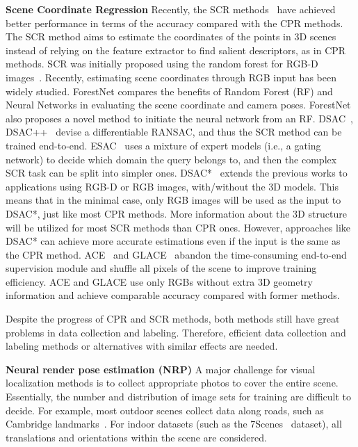 \textbf{Scene Coordinate Regression} Recently, the SCR methods~\cite{shotton2013scene,brachmann2017dsac,brachmann2018learning,esac,massiceti2017random,li2018scene,brachmann2021visual,liu2025egfs} have achieved better performance in terms of the accuracy compared with the CPR methods. The SCR method aims to estimate the coordinates of the points in 3D scenes instead of relying on the feature extractor to find salient descriptors, as in CPR methods. SCR was initially proposed using the random forest for RGB-D images~\cite{shotton2013scene}. Recently, estimating scene coordinates through RGB input has been widely studied. ForestNet\cite{massiceti2017random} compares the benefits of Random Forest (RF) and Neural Networks in evaluating the scene coordinate and camera poses. ForestNet also proposes a novel method to initiate the neural network from an RF. DSAC~\cite{brachmann2017dsac}, DSAC++~\cite{brachmann2018learning} devise a differentiable RANSAC, and thus the SCR method can be trained end-to-end. ESAC~\cite{esac} uses a mixture of expert models (i.e., a gating network) to decide which domain the query belongs to, and then the complex SCR task can be split into simpler ones. DSAC*~\cite{brachmann2021visual} extends the previous works to applications using RGB-D or RGB images, with/without the 3D models. 
This means that in the minimal case, only RGB images will be used as the input to DSAC*, just like most CPR methods. 
More information about the 3D structure will be utilized for most SCR methods than CPR ones. However, approaches like DSAC* can achieve more accurate estimations even if the input is the same as the CPR method.
ACE~\cite{brachmann2023ace} and GLACE~\cite{wang2024glace} abandon the time-consuming end-to-end supervision module and shuffle all pixels of the scene to improve training efficiency. ACE and GLACE use only RGBs without extra 3D geometry information and achieve comparable accuracy compared with former methods.

Despite the progress of CPR and SCR methods, both methods still have great problems in data collection and labeling. Therefore, efficient data collection and labeling methods or alternatives with similar effects are needed.

\textbf{Neural render pose estimation (NRP)}
A major challenge for visual localization methods is to collect appropriate photos to cover the entire scene. Essentially, the number and distribution of image sets for training are difficult to decide.
For example, most outdoor scenes collect data along roads, such as Cambridge landmarks~\cite{kendall2015posenet}. For indoor datasets (such as the 7Scenes~\cite{shotton2013scene} dataset), all translations and orientations within the scene are considered.


